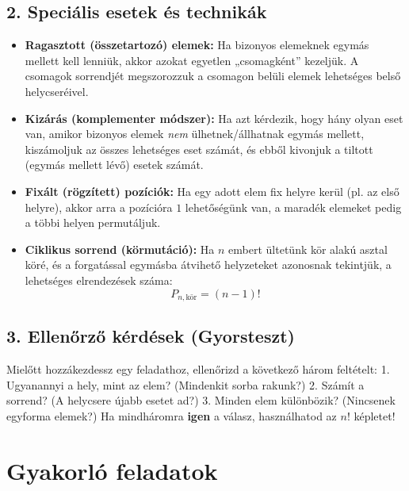 \documentclass[12pt,a4paper]{article}
\begin{document}
\subsection*{2. Speciális esetek és technikák}
\begin{itemize}
    \item \textbf{Ragasztott (összetartozó) elemek:} Ha bizonyos elemeknek egymás mellett kell lenniük, akkor azokat egyetlen „csomagként” kezeljük. A csomagok sorrendjét megszorozzuk a csomagon belüli elemek lehetséges belső helycseréivel.
    \item \textbf{Kizárás (komplementer módszer):} Ha azt kérdezik, hogy hány olyan eset van, amikor bizonyos elemek \emph{nem} ülhetnek/állhatnak egymás mellett, kiszámoljuk az összes lehetséges eset számát, és ebből kivonjuk a tiltott (egymás mellett lévő) esetek számát.
    \item \textbf{Fixált (rögzített) pozíciók:} Ha egy adott elem fix helyre kerül (pl. az első helyre), akkor arra a pozícióra $1$ lehetőségünk van, a maradék elemeket pedig a többi helyen permutáljuk.
    \item \textbf{Ciklikus sorrend (körmutáció):} Ha $n$ embert ültetünk kör alakú asztal köré, és a forgatással egymásba átvihető helyzeteket azonosnak tekintjük, a lehetséges elrendezések száma:
    \begin{equation}
        P_{n,\text{kör}} = (n - 1)!
    \end{equation}
\end{itemize}

\subsection*{3. Ellenőrző kérdések (Gyorsteszt)}
Mielőtt hozzákezdessz egy feladathoz, ellenőrizd a következő három feltételt:
1. Ugyanannyi a hely, mint az elem? (Mindenkit sorba rakunk?)
2. Számít a sorrend? (A helycsere újabb esetet ad?)
3. Minden elem különbözik? (Nincsenek egyforma elemek?)
Ha mindháromra \textbf{igen} a válasz, használhatod az $n!$ képletet!

\newpage

\section*{Gyakorló feladatok}
\end{document}
